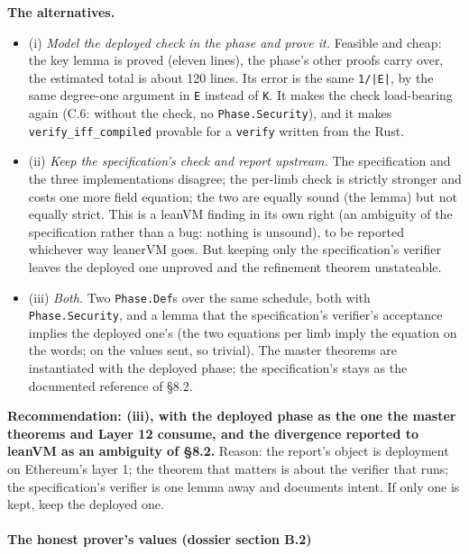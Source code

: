 \textbf{The alternatives.}

\begin{itemize}
\item (i) \emph{Model the deployed check in the phase and prove it.} Feasible and cheap: the key lemma is proved (eleven lines), the phase's other proofs carry over, the estimated total is about 120 lines. Its error is the same \texttt{1/\allowbreak{}|E|}, by the same degree-one argument in \texttt{E} instead of \texttt{K}. It makes the check load-bearing again (C.6: without the check, no \texttt{Phase.\allowbreak{}Security}), and it makes \texttt{verify\_\allowbreak{}iff\_\allowbreak{}compiled} provable for a \texttt{verify} written from the Rust.
\item (ii) \emph{Keep the specification's check and report upstream.} The specification and the three implementations disagree; the per-limb check is strictly stronger and costs one more field equation; the two are equally sound (the lemma) but not equally strict. This is a leanVM finding in its own right (an ambiguity of the specification rather than a bug: nothing is unsound), to be reported whichever way leanerVM goes. But keeping only the specification's verifier leaves the deployed one unproved and the refinement theorem unstateable.
\item (iii) \emph{Both.} Two \texttt{Phase.\allowbreak{}Def}s over the same schedule, both with \texttt{Phase.\allowbreak{}Security}, and a lemma that the specification's verifier's acceptance implies the deployed one's (the two equations per limb imply the equation on the words; on the values sent, so trivial). The master theorems are instantiated with the deployed phase; the specification's stays as the documented reference of §8.2.
\end{itemize}

\textbf{Recommendation: (iii), with the deployed phase as the one the master theorems and Layer 12 consume, and the divergence reported to leanVM as an ambiguity of §8.2.} Reason: the report's object is deployment on Ethereum's layer 1; the theorem that matters is about the verifier that runs; the specification's verifier is one lemma away and documents intent. If only one is kept, keep the deployed one.

\paragraph{The honest prover's values (dossier section B.2)}\label{sec:gen-pubinput-B2}

